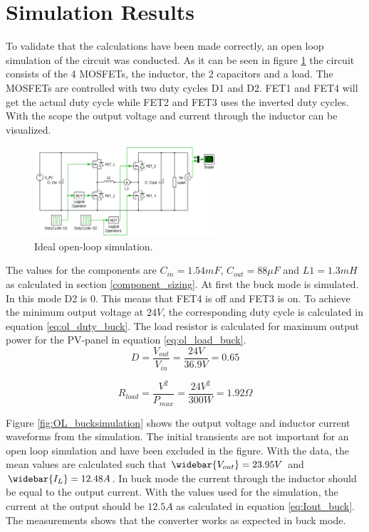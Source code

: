 \section{Simulation Results} \label{opsimresult}

To validate that the calculations have been made correctly, an open loop simulation of the circuit was conducted. As it can be seen in figure \ref{fig:openloop_schematic} the circuit consists of the 4 MOSFETs, the inductor, the 2 capacitors and a load. The MOSFETs are controlled with two duty cycles D1 and D2. FET1 and FET4 will get the actual duty cycle while FET2 and FET3 uses the inverted duty cycles. With the scope the output voltage and current through the inductor can be visualized.

\begin{figure}[H]
	\begin{center}
		\includegraphics[width=0.6\textwidth]{../Pictures/P1/Open_loop_simulation/open_loop_schematic}
		\caption{Ideal open-loop simulation.}
		\label{fig:openloop_schematic}
	\end{center}
\end{figure}
The values for the components are $C_{in}=1.54mF$, $C_{out}=88 \mu F$ and $L1=1.3mH$ as calculated in section \ref{component_sizing}. At first the buck mode is simulated. In this mode D2 is 0. This means that FET4 is off and FET3 is on. To achieve the minimum output voltage at $24V$, the corresponding duty cycle is calculated in equation \ref{eq:ol_duty_buck}. The load resistor is calculated for maximum output power for the PV-panel in equation \ref{eq:ol_load_buck}.
\begin{equation} \label{eq:ol_duty_buck}
	D= \frac{V_{out}}{V_{in}} = \frac{24V}{36.9V} = 0.65
\end{equation}

\begin{equation} \label{eq:ol_load_buck}
	R_{load} = \frac{V^2}{P_{max}} = \frac{24V^2}{300W} = 1.92 \Omega
\end{equation}

Figure \ref{fig:OL_bucksimulation} shows the output voltage and inductor current waveforms from the simulation. The initial transients are not important for an open loop simulation and have been excluded in the figure. With the data, the mean values are calculated such that $\widebar{V_{out}} = 23.95V$ and $\widebar{I_L} = 12.48A$. In buck mode the current through the inductor should be equal to the output current. With the values used for the simulation, the current at the output should be $12.5A$ as calculated in equation \ref{eq:Iout_buck}. The measurements shows that the converter works as expected in buck mode.

